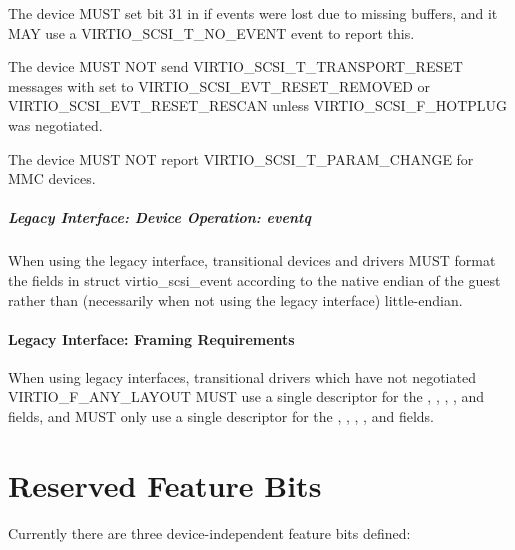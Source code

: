 The device MUST set bit 31 in  if events were lost due to
missing buffers, and it MAY use a VIRTIO_SCSI_T_NO_EVENT event to report
this.

The device MUST NOT send VIRTIO_SCSI_T_TRANSPORT_RESET messages
with  set to VIRTIO_SCSI_EVT_RESET_REMOVED or
VIRTIO_SCSI_EVT_RESET_RESCAN unless VIRTIO_SCSI_F_HOTPLUG was negotiated.

The device MUST NOT report VIRTIO_SCSI_T_PARAM_CHANGE for MMC devices.

\paragraph{Legacy Interface: Device Operation: eventq}\label{sec:Device Types / SCSI Host Device / Device Operation / Device Operation: eventq / Legacy Interface: Device Operation: eventq}
When using the legacy interface, transitional devices and drivers
MUST format the fields in struct virtio_scsi_event
according to the native endian of the guest rather than
(necessarily when not using the legacy interface) little-endian.

\subsubsection{Legacy Interface: Framing Requirements}\label{sec:Device
Types / SCSI Host Device / Legacy Interface: Framing Requirements}

When using legacy interfaces, transitional drivers which have not
negotiated VIRTIO_F_ANY_LAYOUT MUST use a single descriptor for the
, , , ,
 and  fields, and MUST only use a single
descriptor for the , ,
, ,  and
 fields.

\chapter{Reserved Feature Bits}\label{sec:Reserved Feature Bits}

Currently there are three device-independent feature bits defined:

